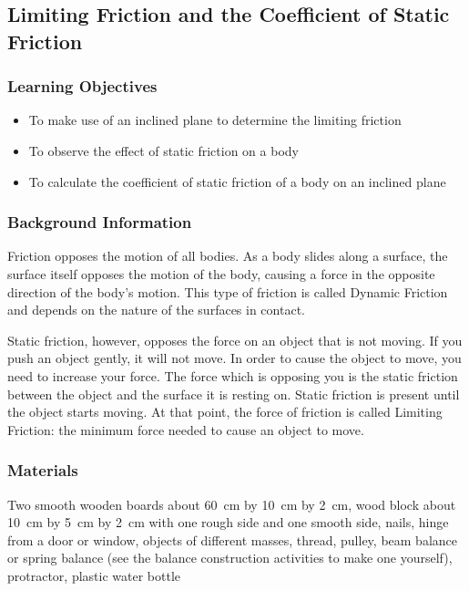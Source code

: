 


\subsection{Limiting Friction and the Coefficient of Static Friction}

\subsubsection*{Learning Objectives}
\begin{itemize}
\item{To make use of an inclined plane to determine the limiting friction} 
\item{To observe the effect of static friction on a body} 
\item{To calculate the coefficient of static friction of a body on an inclined plane} 
\end{itemize}

\subsubsection*{Background Information}
Friction opposes the motion of all bodies. As a body slides along a surface, the surface itself opposes the motion of the body, causing a force in the opposite direction of the body's motion. This type of friction is called Dynamic Friction and depends on the nature of the surfaces in contact.  

Static friction, however, opposes the force on an object that is not moving. If you push an object gently, it will not move. In order to cause the object to move, you need to increase your force. The force which is opposing you is the static friction between the object and the surface it is resting on. Static friction is present until the object starts moving. At that point, the force of friction is called Limiting Friction: the minimum force needed to cause an object to move.  

\subsubsection*{Materials}
Two smooth wooden boards about 60~cm by 10~cm by 2~cm, wood block about 10~cm by 5~cm by 2~cm with one rough side and one smooth side, nails, hinge from a door or window, objects of different masses, thread, pulley, beam balance or spring balance (see the balance construction activities to make one yourself), protractor, plastic water bottle


